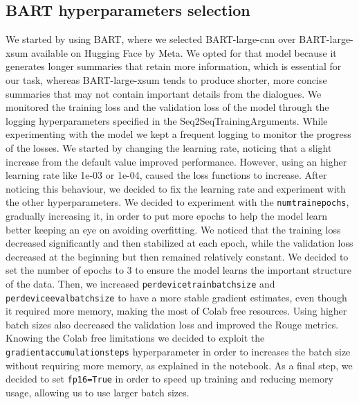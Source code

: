 \documentclass[10pt,twocolumn,letterpaper]{article}
\begin{document}
\subsection{BART hyperparameters selection}
We started by using BART, where we selected BART-large-cnn over BART-large-xsum available on Hugging Face by Meta. We opted for that model because it generates longer summaries that retain more information, which is essential for our task, whereas BART-large-xsum tends to produce shorter, more concise summaries that may not contain important details from the dialogues.
We monitored the training loss and the validation loss of the model through the logging hyperparameters specified in the Seq2SeqTrainingArguments. While experimenting with the model we kept a frequent logging to monitor the progress of the losses. 
We started by changing the learning rate, noticing that a slight increase from the default value improved performance. However, using an higher learning rate like 1e-03 or 1e-04, caused the loss functions to increase. After noticing this behaviour, we decided to fix the learning rate and experiment with the other hyperparameters. 
We decided to experiment with the \texttt{num\textunderscore train\textunderscore epochs}, gradually increasing it, in order to put more epochs to help the model learn 
better keeping an eye on avoiding overfitting. We noticed that the training loss decreased significantly and then stabilized at each epoch, while the validation loss 
decreased at the beginning but then remained relatively constant. We decided to set the number of epochs to 3 to ensure the model learns the important structure of the data.
Then, we increased \texttt{per\textunderscore device\textunderscore train\textunderscore batch\textunderscore size} and 
\texttt{per\textunderscore device\textunderscore eval\textunderscore batch\textunderscore size} to have a more stable gradient estimates, even though it required more memory, making the most of Colab free resources. 
Using higher batch sizes also decreased the validation loss and improved the Rouge metrics. 
Knowing the Colab free limitations we decided to exploit the \texttt{gradient\textunderscore accumulation\textunderscore steps} hyperparameter in order to increases the batch 
size without requiring more memory, as explained in the notebook.
As a final step, we decided to set \texttt{fp16=True} in order to speed up training and reducing memory usage, allowing us to use larger batch sizes.
\end{document}
